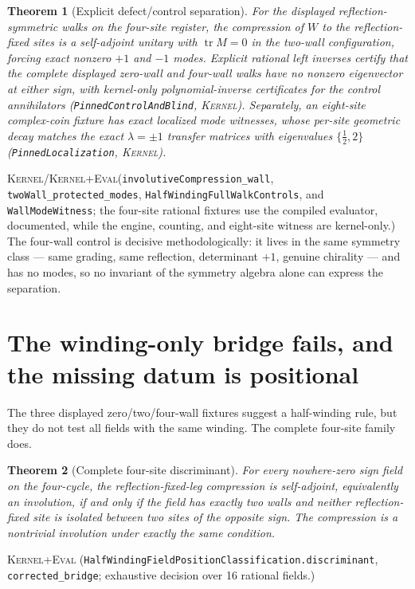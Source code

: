 \documentclass[11pt]{article}
\newcommand{\tr}{\operatorname{tr}}
\newcommand{\Kernel}{\textcolor{kernelcolor}{\textsc{Kernel}}}
\newcommand{\DraftTrust}{\textcolor{draftcolor}{\textsc{Kernel+Eval}}}
\newtheorem{theorem}{Theorem}
\begin{document}
\begin{theorem}[Explicit defect/control separation]\label{thm:halfwinding}
For the displayed reflection-symmetric walks on the four-site register, the
compression of $W$ to the reflection-fixed sites is a self-adjoint unitary
with $\tr M=0$ in the two-wall configuration, forcing exact nonzero $+1$
and $-1$ modes.  Explicit rational left inverses certify that the complete
displayed zero-wall and four-wall walks have no nonzero eigenvector at either
sign, with kernel-only polynomial-inverse certificates for the control
annihilators (\texttt{PinnedControlAndBlind}, \Kernel{}).  Separately, an
eight-site complex-coin fixture has exact localized
mode witnesses, whose per-site geometric decay matches the exact
$\lambda=\pm1$ transfer matrices with eigenvalues $\{\tfrac12,2\}$
(\texttt{PinnedLocalization}, \Kernel{}).
\end{theorem}
\noindent\Kernel{}/\DraftTrust{}\quad(\texttt{involutiveCompression\_wall},
\texttt{twoWall\_protected\_modes},
\texttt{HalfWindingFullWalkControls}, and \texttt{WallModeWitness}; the
four-site rational fixtures use the compiled evaluator, documented, while the
engine, counting, and eight-site witness are kernel-only.)  The four-wall control is decisive
methodologically: it lives in the same symmetry class --- same grading,
same reflection, determinant $+1$, genuine chirality --- and has no modes,
so no invariant of the symmetry algebra alone can express the separation.

\section{The winding-only bridge fails, and the missing datum is positional}

The three displayed zero/two/four-wall fixtures suggest a half-winding rule,
but they do not test all fields with the same winding.  The complete four-site
family does.

\begin{theorem}[Complete four-site discriminant]\label{thm:position}
For every nowhere-zero sign field on the four-cycle, the reflection-fixed-leg
compression is self-adjoint, equivalently an involution, if and only if the
field has exactly two walls and neither reflection-fixed site is isolated
between two sites of the opposite sign.  The compression is a nontrivial
involution under exactly the same condition.
\end{theorem}
\noindent\DraftTrust{}\quad
(\texttt{HalfWindingFieldPositionClassification.discriminant},
\texttt{corrected\_bridge}; exhaustive decision over 16 rational fields.)
\end{document}
